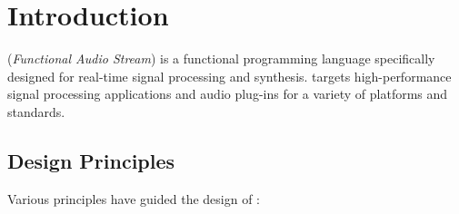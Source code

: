 \documentclass[a4paper]{book}
\begin{document}
\maketitle


\chapter{Introduction}

\faust (\textit{Functional Audio Stream}) is a functional programming language specifically designed for real-time signal processing and synthesis.  \faust targets high-performance signal processing applications and audio plug-ins for a variety of platforms and standards. 

\section{Design Principles}

Various principles have guided the design of \faust :
\end{document}
